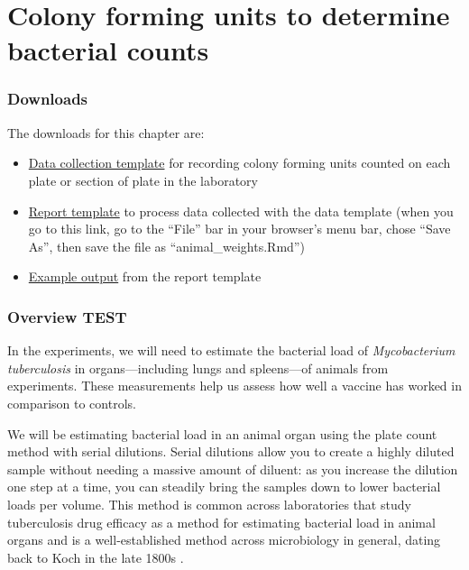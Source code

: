 \documentclass[
]{book}
\providecommand{\tightlist}{%
  \setlength{\itemsep}{0pt}\setlength{\parskip}{0pt}}
\begin{document}
\hypertarget{colony-forming-units-to-determine-bacterial-counts}{%
\chapter{Colony forming units to determine bacterial counts}\label{colony-forming-units-to-determine-bacterial-counts}}

\hypertarget{downloads-1}{%
\subsection{Downloads}\label{downloads-1}}

The downloads for this chapter are:

\begin{itemize}
\tightlist
\item
  \href{https://github.com/csu-impactb/CODING-TEAM-BOOKDOWN-/raw/main/templates/data_collection_templates/cfu_collection_template.xlsx}{Data collection template} for recording colony forming units counted on each
  plate or section of plate in the laboratory
\item
  \href{https://raw.githubusercontent.com/csu-impactb/CODING-TEAM-BOOKDOWN-/main/templates/report_templates/cfu_report.Rmd}{Report template} to process data collected with the data template (when you go to this link, go to the ``File'' bar in your browser's menu bar, chose ``Save As'', then save the file as ``animal\_weights.Rmd'')
\item
  \href{https://github.com/csu-impactb/CODING-TEAM-BOOKDOWN-/raw/main/templates/report_templates/cfu_report.docx}{Example output} from the report template
\end{itemize}

\hypertarget{overview-test}{%
\subsection{Overview TEST}\label{overview-test}}

In the experiments, we will need to estimate the bacterial load of
\emph{Mycobacterium tuberculosis} in organs---including lungs and spleens---of
animals from experiments. These measurements help us assess how well a vaccine
has worked in comparison to controls.

We will be estimating bacterial load in an animal organ using the plate count
method with serial dilutions. Serial dilutions allow you to create a
highly diluted sample without needing a massive amount of diluent: as you
increase the dilution one step at a time, you can steadily bring the samples
down to lower bacterial loads per volume. This method is common across
laboratories that study tuberculosis drug efficacy as a method for estimating
bacterial load in animal organs \citep{franzblau2012comprehensive} and is a
well-established method across microbiology in general, dating back to Koch in
the late 1800s \citep{wilson1922proportion, ben2014estimation}.
\end{document}
